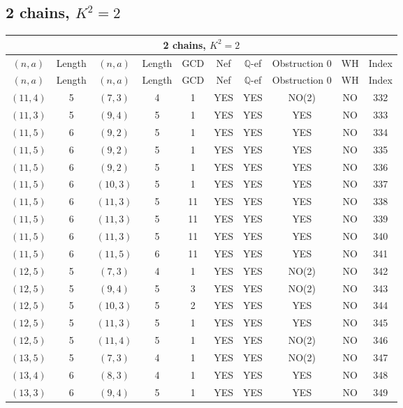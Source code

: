 \subsection{2 chains, $K^2 = 2$}
\begin{longtable}{|c|c|c|c|c|c|c|c|c|c|}
\hline
\multicolumn{10}{|c|}{2 chains, $K^2 = 2$}\\
\hline
$(n,a)$ & Length & $(n,a)$ & Length & GCD & Nef & $\mathbb Q$-ef & Obstruction 0 & WH & Index\\
\hline
\endfirsthead

\hline
$(n,a)$ & Length & $(n,a)$ & Length & GCD & Nef & $\mathbb Q$-ef & Obstruction 0 & WH & Index\\
\hline
\endhead
\hline
\endfoot

$(11, 4)$ & 5 & $(7, 3)$ & 4 & 1 & YES & YES & NO(2) & NO & 332\\
$(11, 3)$ & 5 & $(9, 4)$ & 5 & 1 & YES & YES & YES & NO & 333\\
$(11, 5)$ & 6 & $(9, 2)$ & 5 & 1 & YES & YES & YES & NO & 334\\
$(11, 5)$ & 6 & $(9, 2)$ & 5 & 1 & YES & YES & YES & NO & 335\\
$(11, 5)$ & 6 & $(9, 2)$ & 5 & 1 & YES & YES & YES & NO & 336\\
$(11, 5)$ & 6 & $(10, 3)$ & 5 & 1 & YES & YES & YES & NO & 337\\
$(11, 5)$ & 6 & $(11, 3)$ & 5 & 11 & YES & YES & YES & NO & 338\\
$(11, 5)$ & 6 & $(11, 3)$ & 5 & 11 & YES & YES & YES & NO & 339\\
$(11, 5)$ & 6 & $(11, 3)$ & 5 & 11 & YES & YES & YES & NO & 340\\
$(11, 5)$ & 6 & $(11, 5)$ & 6 & 11 & YES & YES & YES & NO & 341\\
$(12, 5)$ & 5 & $(7, 3)$ & 4 & 1 & YES & YES & NO(2) & NO & 342\\
$(12, 5)$ & 5 & $(9, 4)$ & 5 & 3 & YES & YES & NO(2) & NO & 343\\
$(12, 5)$ & 5 & $(10, 3)$ & 5 & 2 & YES & YES & YES & NO & 344\\
$(12, 5)$ & 5 & $(11, 3)$ & 5 & 1 & YES & YES & YES & NO & 345\\
$(12, 5)$ & 5 & $(11, 4)$ & 5 & 1 & YES & YES & NO(2) & NO & 346\\
$(13, 5)$ & 5 & $(7, 3)$ & 4 & 1 & YES & YES & NO(2) & NO & 347\\
$(13, 4)$ & 6 & $(8, 3)$ & 4 & 1 & YES & YES & YES & NO & 348\\
$(13, 3)$ & 6 & $(9, 4)$ & 5 & 1 & YES & YES & YES & NO & 349\\

\end{longtable}

